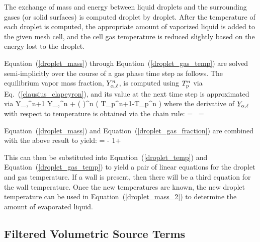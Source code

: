 The exchange of mass and energy between liquid droplets and the surrounding gases (or solid surfaces) is computed droplet by droplet. After the temperature of each droplet is computed, the
appropriate amount of vaporized liquid is added to the given mesh cell, and the cell gas temperature is reduced slightly based on the energy lost to the droplet.

Equation~(\ref{droplet_mass}) through Equation~(\ref{droplet_gas_temp}) are solved semi-implicitly over the course of a gas phase time step as follows. The equilibrium vapor mass fraction, $Y_{\rm \alpha,\ell}^n$, is computed using $T_{\rm p}^n$ via Eq.~(\ref{clausius_clapeyron}), and its value at the next time step is approximated via
\be
Y_{\rm \alpha,\ell}^{n+1} \approx Y_{\rm \alpha,\ell}^n + \left(  \right)^n \; \Big( T_{\rm p}^{n+1}-T_{\rm p}^n \Big)
\ee
where the derivative of $Y_{\rm \alpha,\ell}$ with respect to temperature is obtained via the chain rule:
\be
{} =  \,   =  \;
 \, \exp {}
\ee

Equation~(\ref{droplet_mass}) and Equation~(\ref{droplet_gas_fraction}) are combined with the above result to yield:
\be
    = -   {1+} \label{droplet_mass_2}
\ee

This can then be substituted into Equation~(\ref{droplet_temp}) and Equation~(\ref{droplet_gas_temp}) to yield a pair of linear equations for the droplet and gas temperature. If a wall is present, then there will be a third equation for the wall temperature. Once the new temperatures are known, the new droplet temperature can be used in Equation~(\ref{droplet_mass_2}) to determine the amount of evaporated liquid.


\subsection{Filtered Volumetric Source Terms}

